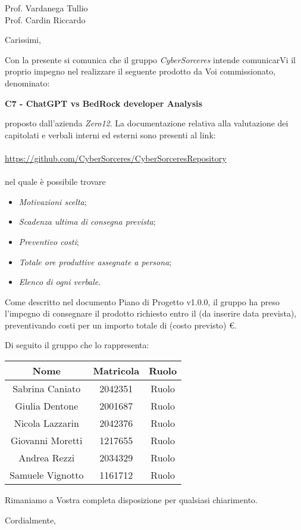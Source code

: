 \documentclass[12pt]{letter}
\begin{document}
\begin{letter}
{
	Prof. Vardanega Tullio \\
 	Prof. Cardin Riccardo
}




\opening{Carissimi,}

Con la presente si comunica che il gruppo
\textit{CyberSorceres} intende comunicarVi il proprio 
impegno nel realizzare il seguente prodotto da Voi
commissionato, denominato:

\textbf{C7 - ChatGPT vs BedRock developer Analysis}

proposto dall'azienda \textit{Zero12}.
La documentazione relativa alla valutazione dei capitolati e verbali interni ed esterni sono presenti al link: 	\\ \\
\href{https://github.com/CyberSorceres/CyberSorceresRepository}{https://github.com/CyberSorceres/CyberSorceresRepository} \\ \\
nel quale è possibile trovare
\begin{itemize}
	\item \textit{Motivazioni scelta};
	\item \textit{Scadenza ultima di consegna prevista};
	\item \textit{Preventivo costi};
	\item \textit{Totale ore produttive assegnate a persona};
	\item \textit{Elenco di ogni verbale}.
\end{itemize}

Come descritto nel documento Piano di Progetto v1.0.0,
il gruppo ha preso l'impegno di consegnare il prodotto richiesto entro il (da inserire data prevista), preventivando costi per un importo totale di (costo previsto) €.

Di seguito il gruppo che lo rappresenta:

\begin{tabular}{|c|c|c|}
\hline
Nome & Matricola & Ruolo \\
\hline
Sabrina Caniato & 2042351 & Ruolo \\
Giulia Dentone & 2001687 & Ruolo \\
Nicola Lazzarin & 2042376 & Ruolo \\
Giovanni Moretti & 1217655 & Ruolo \\
Andrea Rezzi & 2034329 & Ruolo \\
Samuele Vignotto & 1161712 & Ruolo \\
\hline
\end{tabular}

Rimaniamo a Vostra completa disposizione per qualsiasi chiarimento.
\closing{Cordialmente,}

\end{letter}
\end{document}
